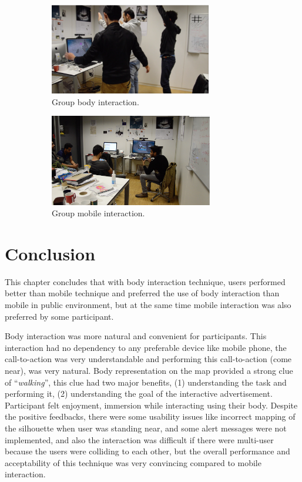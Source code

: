 \begin{figure}[H]
    \centering
    \begin{subfigure}[H]{0.45\textwidth}
        \centering
        \includegraphics[width=\textwidth,height=4cm]{Figures/6/groupBody}
        \caption{Group body interaction.}
        \label{fig:groupbody}
    \end{subfigure}
    \begin{subfigure}[H]{0.45\textwidth}
        \centering
        \includegraphics[width=\textwidth,height=4cm]{Figures/6/groupMobile}
        \caption{Group mobile interaction.}
        \label{fig:groupmobile}
    \end{subfigure}
    \caption{}
    \label{fig:Focus_group_room_interactive}
\end{figure}

\newpage
\section{Conclusion}
This chapter concludes that with body interaction technique, users performed better than mobile technique and preferred the use of body interaction than mobile in public environment, but at the same time mobile interaction was also preferred by some participant. 

Body interaction was more natural and convenient for participants. This interaction had no dependency to any preferable device like mobile phone, the call-to-action was very understandable and performing this call-to-action (come near), was very natural. Body representation on the map provided a strong clue of ``\emph{walking}'', this clue had two major benefits, (1) understanding the task and performing it, (2) understanding the goal of the interactive advertisement. Participant felt enjoyment, immersion while interacting using their body. Despite the positive feedbacks, there were some usability issues like incorrect mapping of the silhouette when user was standing near, and some alert messages were not implemented, and also the interaction was difficult if there were multi-user because the users were colliding to each other, but the overall performance and acceptability of this technique was very convincing compared to mobile interaction.

